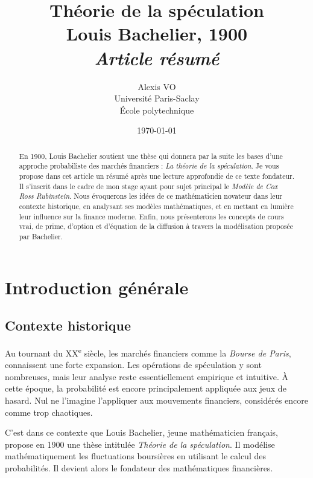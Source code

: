 \documentclass[12pt,a4paper]{article}
\title{\Huge{\textbf{Théorie de la spéculation\\ Louis Bachelier, 1900}}\\ \medskip
      \Huge{\textit{Article résumé}}\vspace*{0.7cm}}
\author{\LARGE{Alexis VO}\vspace{1cm}\\ \medskip
      Université Paris-Saclay\\École polytechnique}
\date{\vspace{0.2cm}\today}
\begin{document}
\vspace{\fill}
  \maketitle
\vspace{\fill}

\newpage

\tableofcontents

\begin{abstract}
En 1900, Louis Bachelier soutient une thèse qui donnera par la suite les bases d’une approche probabiliste des marchés financiers : \textit{La théorie de la spéculation}. Je vous propose dans cet article un résumé après une lecture approfondie de ce texte fondateur. Il s'inscrit dans le cadre de mon stage ayant pour sujet principal le \textit{Modèle de Cox Ross Rubinstein}. Nous évoquerons les idées de ce mathématicien novateur dans leur contexte historique, en analysant ses modèles mathématiques, et en mettant en lumière leur influence sur la finance moderne. Enfin, nous présenterons les concepts de cours vrai, de prime, d’option et d’équation de la diffusion à travers la modélisation proposée par Bachelier.
\end{abstract}

\newpage

\section{Introduction générale}

\subsection{Contexte historique}

Au tournant du XX\textsuperscript{e} siècle, les marchés financiers comme la \textit{Bourse de Paris}, connaissent une forte expansion. Les opérations de spéculation y sont nombreuses, mais leur analyse reste essentiellement empirique et intuitive. À cette époque, la probabilité est encore principalement appliquée aux jeux de hasard. Nul ne l'imagine l’appliquer aux mouvements financiers, considérés encore comme trop chaotiques.

C’est dans ce contexte que Louis Bachelier, jeune mathématicien français, propose en 1900 une thèse intitulée \textit{Théorie de la spéculation}. Il modélise mathématiquement les fluctuations boursières en utilisant le calcul des probabilités. Il devient alors le fondateur des mathématiques financières.
\end{document}
